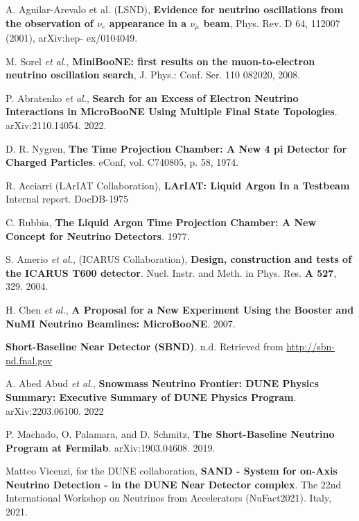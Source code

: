  A. Aguilar-Arevalo et al. (LSND), \textbf{Evidence for neutrino oscillations from the observation of $\nu_e$ appearance in a $\nu_{\mu}$ beam}, Phys. Rev. D 64, 112007 (2001), arXiv:hep- ex/0104049.

 M. Sorel \textit{et al.}, \textbf{MiniBooNE: first results on the muon-to-electron neutrino oscillation search}, J. Phys.: Conf. Ser. 110 082020, 2008.

 P. Abratenko \textit{et al.}, \textbf{Search for an Excess of Electron Neutrino Interactions in MicroBooNE Using Multiple Final State Topologies}. arXiv:2110.14054. 2022.

 D. R. Nygren, \textbf{The Time Projection Chamber: A New 4 pi Detector for Charged Particles}. eConf, vol. C740805, p. 58, 1974.

 R. Acciarri (LArIAT Collaboration), \textbf{LArIAT:
Liquid Argon In a Testbeam} Internal report. DocDB-1975

 C. Rubbia, \textbf{The Liquid Argon Time Projection Chamber: A New Concept for Neutrino Detectors}. 1977.

 S. Amerio \textit{et al.}, (ICARUS Collaboration), \textbf{Design, construction and tests of the ICARUS T600 detector}. Nucl. Instr. and Meth. in Phys. Res. \textbf{A 527}, 329. 2004.

 H. Chen \textit{et al.}, \textbf{A Proposal for a New Experiment Using the Booster and NuMI Neutrino Beamlines: MicroBooNE}. 2007.

 \textbf{Short-Baseline Near Detector (SBND)}. n.d. Retrieved from \href{http://sbn-nd.fnal.gov}{http://sbn-nd.fnal.gov}

 A. Abed Abud \textit{et al.}, \textbf{Snowmass Neutrino Frontier: DUNE Physics Summary: Executive Summary of DUNE Physics Program}. arXiv:2203.06100. 2022

 P. Machado, O. Palamara, and D. Schmitz, \textbf{The Short-Baseline Neutrino Program at Fermilab}. arXiv:1903.04608. 2019. 

 Matteo Vicenzi, for the DUNE collaboration, \textbf{SAND - System for on-Axis Neutrino Detection - in the DUNE Near Detector complex}. The 22nd International Workshop on Neutrinos from Accelerators (NuFact2021). Italy, 2021.
